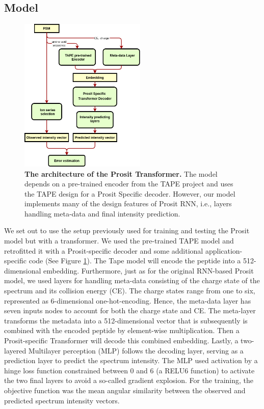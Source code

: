 \documentclass[10pt,a4paper]{article}
\begin{document}
\subsection*{Model}

\begin{figure}[htb!]
    \centering
    \includegraphics[width=6cm]{./img/architecture.png}
    \caption{{\bf The architecture of the Prosit Transformer.} The model depends on a pre-trained encoder from the TAPE project and uses the TAPE design for a Prosit Specific decoder. However, our model implements many of the design features of Prosit RNN, i.e., layers handling meta-data and final intensity prediction. \label{fig:architecture}}
\end{figure}
    

We set out to use the setup previously used for training and testing the Prosit model but with a transformer. We used the pre-trained TAPE model \cite{Rao2019-qq} and retrofitted it with a Prosit-specific decoder and some additional application-specific code (See Figure \ref{fig:architecture}). The Tape model will encode the peptide into a 512-dimensional embedding. Furthermore, just as for the original RNN-based Prosit model, we used layers for handling meta-data consisting of the charge state of the spectrum and its collision energy (CE). The charge states range from one to six, represented as 6-dimensional one-hot-encoding. Hence, the meta-data layer has seven inputs nodes to account for both the charge state and CE. The meta-layer transforms the metadata into a 512-dimensional vector that is subsequently is combined with the encoded peptide by element-wise multiplication. Then a Prosit-specific Transformer will decode this combined embedding. Lastly, a two-layered Multilayer perception (MLP) follows the decoding layer, serving as a prediction layer to predict the spectrum intensity. The MLP used activation by a hinge loss function constrained between 0 and 6 (a RELU6 function) to activate the two final layers to avoid a so-called gradient explosion. For the training, the objective function was the mean angular similarity between the observed and predicted spectrum intensity vectors.
\end{document}

